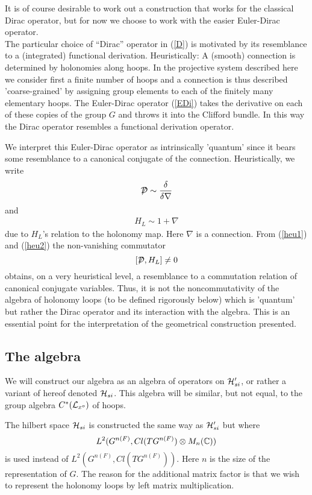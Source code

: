 \documentclass[12pt]{article}
\newcommand{\ba}{\begin{eqnarray}}
\newcommand{\ea}{\end{eqnarray}}
\def\d{\delta}
\def\cd{{\cal D}}
\def\ch{{\cal H}}
\def\cl{{\cal L}}
\newcommand{\bbC}{{\Bbb C}}
\begin{document}
It is of course desirable to work
out a construction that works for the classical Dirac operator, but for now we
choose to work with the easier Euler-Dirac operator.\\



The particular choice of ``Dirac'' operator in (\ref{D}) is motivated by its resemblance
to a (integrated) functional derivation. Heuristically: A (smooth) connection is determined by holonomies along hoops. In the projective
system described here we consider first a finite number of hoops and a
connection is thus described 'coarse-grained' by assigning group elements to each of the
finitely many elementary
hoops. The Euler-Dirac operator (\ref{EDi}) takes the derivative on each of these copies of the
group $G$ and throws it into the Clifford bundle. In this way the Dirac
operator resembles a functional derivation operator.  

We interpret this Euler-Dirac operator as intrinsically 'quantum'
since it bears some resemblance to a canonical conjugate of the
connection. Heuristically, we write
\ba
\displaystyle{\not} \cd \sim\frac{\d}{\d\nabla}
\label{heu1}
\ea
and 
\ba
H_L \sim 1 + \nabla
\label{heu2}
\ea
due to $H_L$'s relation to the holonomy map. Here $\nabla$ is a
connection. From (\ref{heu1}) and (\ref{heu2}) the non-vanishing commutator
\[
[\displaystyle{\not} \cd,H_L] \not = 0
\]
obtains, on a very heuristical level, a resemblance to a commutation relation
of canonical conjugate variables. Thus, it is not the noncommutativity of the algebra of
holonomy loops
(to be defined rigorously below) which is 'quantum' but rather the Dirac
operator and its interaction with the algebra. This is an essential point for the interpretation of the geometrical
construction presented.



\subsection{The algebra}

We will construct our algebra as an algebra of operators on $\ch'_{si}$, or
rather a variant of hereof denoted $\ch_{si}$. This algebra will be similar, but not equal,
to the group algebra $C^*(\cl_{x^o})$ of hoops. 

 The hilbert space $\ch_{si}$ is constructed the same way as $\ch'_{si}$ but
 where $$L^2(G^{n(F)},Cl(TG^{n(F)})\otimes M_n(\bbC))$$  is used instead of
 $L^2(G^{n(F)},Cl(TG^{n(F)}))$. Here $n$ is the size of the representation of $G$. The reason for the additional matrix factor is
 that we wish to represent the holonomy loops by left matrix
 multiplication. 
\end{document}
